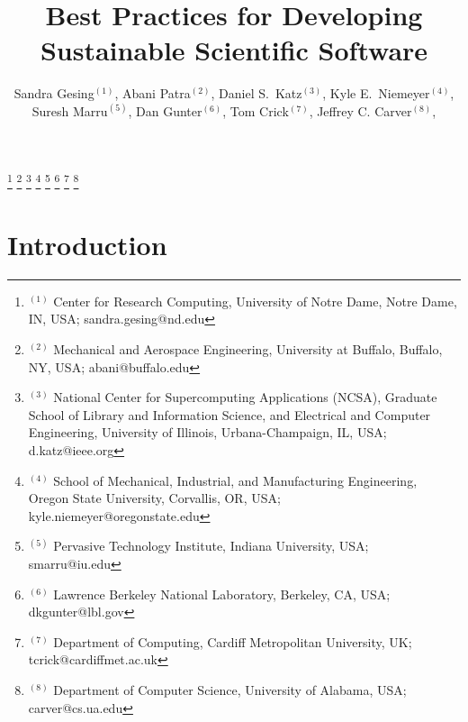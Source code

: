 \documentclass[11pt, oneside]{amsart}
\begin{document}
\title[]{Best Practices for Developing Sustainable Scientific Software}

\author{Sandra Gesing$^{(1)}$,
Abani Patra$^{(2)}$,
Daniel S.\ Katz$^{(3)}$,
Kyle E.\ Niemeyer$^{(4)}$,
Suresh Marru$^{(5)}$,
Dan Gunter$^{(6)}$,
Tom Crick$^{(7)}$,
Jeffrey C. Carver$^{(8)}$,
}

%
\thanks{{}$^{(1)}$ Center for Research Computing, University of Notre Dame, Notre Dame, IN, USA; sandra.gesing@nd.edu}
%
\thanks{{}$^{(2)}$ Mechanical and Aerospace Engineering, University at Buffalo, Buffalo, NY, USA; abani@buffalo.edu}
%
\thanks{{}$^{(3)}$ National Center for Supercomputing Applications (NCSA), Graduate School of Library and Information Science, and Electrical and Computer Engineering, University of Illinois, Urbana-Champaign, IL, USA; d.katz@ieee.org}
%
\thanks{{}$^{(4)}$ School of Mechanical, Industrial, and Manufacturing Engineering, Oregon State University, Corvallis, OR, USA; kyle.niemeyer@oregonstate.edu}
%
\thanks{{}$^{(5)}$ Pervasive Technology Institute, Indiana University, USA; smarru@iu.edu}
%
\thanks{{}$^{(6)}$ Lawrence Berkeley National Laboratory, Berkeley, CA, USA; dkgunter@lbl.gov}
%
\thanks{{}$^{(7)}$ Department of Computing, Cardiff Metropolitan University, UK; tcrick@cardiffmet.ac.uk}
%
\thanks{{}$^{(8)}$ Department of Computer Science, University of Alabama, USA; carver@cs.ua.edu}
%
 
\begin{abstract}


\end{abstract}

\maketitle
\newpage

\section{Introduction} \label{sec:intro}
\end{document}
